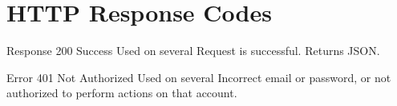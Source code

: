 \chapter{HTTP Response Codes}
Response 200 Success
Used on several
Request is successful.
Returns JSON.

Error 401 Not Authorized
Used on several
Incorrect email or password, or not authorized to perform actions on that account.

